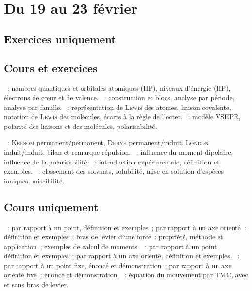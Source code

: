 \documentclass[a4paper, 12pt, final, garamond]{book}
\begin{document}
\setcounter{chapter}{18}

\chapter{Du 19 au 23 f\'evrier}

\section{Exercices uniquement}

\section{Cours et exercices}
\begin{enumerate}[label=\Roman*]
	~: nombres quantiques et
	orbitales atomiques (HP), niveaux d'énergie (HP), électrons de cœur et de
	valence.
	~: construction et blocs, analyse par période,
	analyse par famille.
	~: représentation de
	\textsc{Lewis} des atomes, liaison covalente, notation de \textsc{Lewis}
	des molécules, écarts à la règle de l'octet.
	~: modèle VSEPR, polarité
	des liaisons et des molécules, polarisabilité.
\end{enumerate}

\begin{enumerate}[label=\Roman*]
	~: \textsc{Keesom}
	permanent/permanent, \textsc{Debye} permanent/induit, \textsc{London}
	induit/induit, bilan et remarque répulsion.
	~: influence du moment dipolaire,
	influence de la polarisabilité.
	~: introduction expérimentale, définition et
	exemples.
	~: classement des solvants, solubilité, mise
	en solution d'espèces ioniques, miscibilité.
\end{enumerate}

\section{Cours uniquement}
\begin{enumerate}[label=\Roman*]
	~: par rapport à un point, définition et exemples~;
	par rapport à un axe orienté~: définition et exemples~; bras de levier
	d'une force~: propriété, méthode et application~; exemples de calcul de
	moments.
	~: par rapport à un point, définition et exemples~;
	par rapport à un axe orienté, définition et exemples.
	~: par rapport à un point fixe, énoncé et
	démonstration~; par rapport à un axe orienté fixe~: énoncé et
	démonstration.
	~: équation du mouvement par TMC, avec et
	sans bras de levier.
\end{enumerate}
\end{document}
